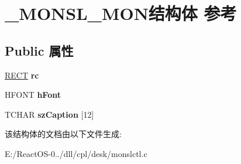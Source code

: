\hypertarget{struct___m_o_n_s_l___m_o_n}{}\section{\+\_\+\+M\+O\+N\+S\+L\+\_\+\+M\+O\+N结构体 参考}
\label{struct___m_o_n_s_l___m_o_n}
\subsection*{Public 属性}
\begin{DoxyCompactItemize}
\item 
\mbox{\label{struct___m_o_n_s_l___m_o_n_a8d9c0d1c6e571eaca89af8a91063d4e5}} 
\hyperlink{structtag_r_e_c_t}{R\+E\+CT} {\bfseries rc}
\item 
\mbox{\label{struct___m_o_n_s_l___m_o_n_a55ffc97bf85266fa2fe4a5b35a9d3b03}} 
H\+F\+O\+NT {\bfseries h\+Font}
\item 
\mbox{\label{struct___m_o_n_s_l___m_o_n_abd7fe7748369f27359a3188b4ea66d15}} 
T\+C\+H\+AR {\bfseries sz\+Caption} \mbox{[}12\mbox{]}
\end{DoxyCompactItemize}


该结构体的文档由以下文件生成\+:\begin{DoxyCompactItemize}
\item 
E\+:/\+React\+O\+S-\/0../dll/cpl/desk/monslctl.\+c\end{DoxyCompactItemize}
